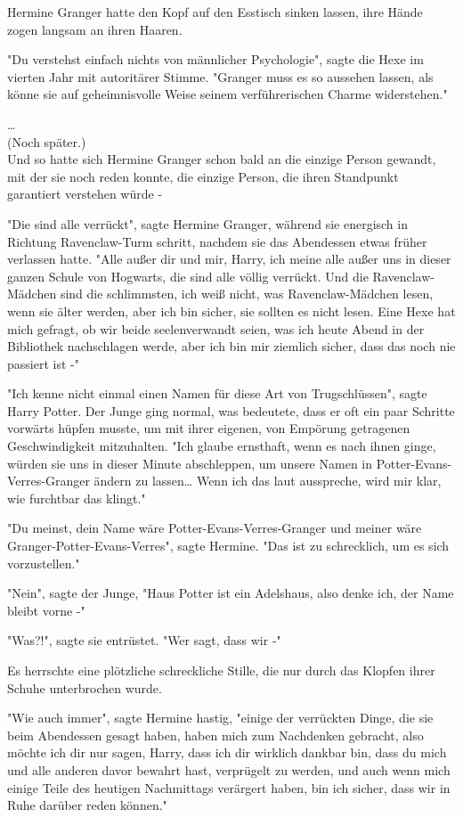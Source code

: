 {Hermine Granger hatte den Kopf auf den Esstisch sinken lassen, ihre Hände zogen langsam an ihren Haaren.

"Du verstehst einfach nichts von männlicher Psychologie", sagte die Hexe im vierten Jahr mit autoritärer Stimme. "Granger muss es so aussehen lassen, als könne sie auf geheimnisvolle Weise seinem verführerischen Charme widerstehen."

…\\ (Noch später.)\\ Und so hatte sich Hermine Granger schon bald an die einzige Person gewandt, mit der sie noch reden konnte, die einzige Person, die ihren Standpunkt garantiert verstehen würde -

"Die sind alle verrückt", sagte Hermine Granger, während sie energisch in Richtung Ravenclaw-Turm schritt, nachdem sie das Abendessen etwas früher verlassen hatte. "Alle außer dir und mir, Harry, ich meine alle außer uns in dieser ganzen Schule von Hogwarts, die sind alle völlig verrückt. Und die Ravenclaw-Mädchen sind die schlimmsten, ich weiß nicht, was Ravenclaw-Mädchen lesen, wenn sie älter werden, aber ich bin sicher, sie sollten es nicht lesen. Eine Hexe hat mich gefragt, ob wir beide seelenverwandt seien, was ich heute Abend in der Bibliothek nachschlagen werde, aber ich bin mir ziemlich sicher, dass das noch nie passiert ist -"

"Ich kenne nicht einmal einen Namen für diese Art von Trugschlüssen", sagte Harry Potter. Der Junge ging normal, was bedeutete, dass er oft ein paar Schritte vorwärts hüpfen musste, um mit ihrer eigenen, von Empörung getragenen Geschwindigkeit mitzuhalten. "Ich glaube ernsthaft, wenn es nach ihnen ginge, würden sie uns in dieser Minute abschleppen, um unsere Namen in Potter-Evans-Verres-Granger ändern zu lassen… Wenn ich das laut ausspreche, wird mir klar, wie furchtbar das klingt."

"Du meinst, dein Name wäre Potter-Evans-Verres-Granger und meiner wäre Granger-Potter-Evans-Verres", sagte Hermine. "Das ist zu schrecklich, um es sich vorzustellen."

"Nein", sagte der Junge, "Haus Potter ist ein Adelshaus, also denke ich, der Name bleibt vorne -"

"Was?!", sagte sie entrüstet. "Wer sagt, dass wir -"

Es herrschte eine plötzliche schreckliche Stille, die nur durch das Klopfen ihrer Schuhe unterbrochen wurde.

"Wie auch immer", sagte Hermine hastig, "einige der verrückten Dinge, die sie beim Abendessen gesagt haben, haben mich zum Nachdenken gebracht, also möchte ich dir nur sagen, Harry, dass ich dir wirklich dankbar bin, dass du mich und alle anderen davor bewahrt hast, verprügelt zu werden, und auch wenn mich einige Teile des heutigen Nachmittags verärgert haben, bin ich sicher, dass wir in Ruhe darüber reden können."

}
